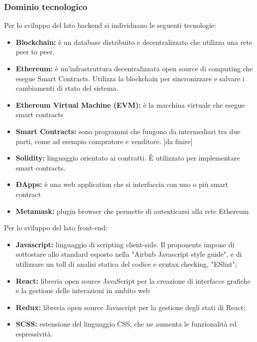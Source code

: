 \subsubsection{Dominio tecnologico}
Per lo sviluppo del lato backend si individuano le seguenti tecnologie:
\begin{itemize}
    \item \textbf{Blockchain: }è un database distribuito e 
    decentralizzato che utilizza una rete peer to peer.
	\item \textbf{Ethereum: }è un'infrastruttura decentralizzata open source di 
computing che
	esegue Smart Contracts. Utilizza la blockchain per sincronizzare e salvare i 
cambiamenti di stato
	del sistema.
	\item \textbf{Ethereum Virtual Machine (EVM): }è la macchina virtuale che 
esegue smart contracts
	\item \textbf{Smart Contracts: } sono programmi che fungono da intermediari tra 
due parti, come ad esempio
	compratore e venditore. [da finire]
	\item \textbf{Solidity: }linguaggio orientato ai contratti. \`E utilizzato per 
implementare smart contracts.
	\item \textbf{ÐApps: }è una web application che si interfaccia con uno o più 
smart contract
	\item \textbf{Metamask:} plugin browser che permette di autenticarsi alla rete 
Ethereum

\end{itemize}
Per lo sviluppo del lato front-end:
\begin{itemize}
	\item \textbf{Javascript:} linguaggio di scripting client-side. Il proponente 
impone di sottostare allo standard esposto nella "Airbnb Javascript style 
guide", e di utilizzare un toll di analisi statica del codice e syntax checking, 
"ESlint";
	\item \textbf{React:}  libreria open source JavaScript per la creazione di 
interfacce grafiche e la gestione delle interazioni in ambito web
	\item \textbf {Redux:} libreria open source Javascript per la gestione degli 
stati di React;
	
	\item \textbf{SCSS:} estensione del linguaggio CSS, che ne aumenta le 
funzionalità ed espressività.
\end{itemize}


